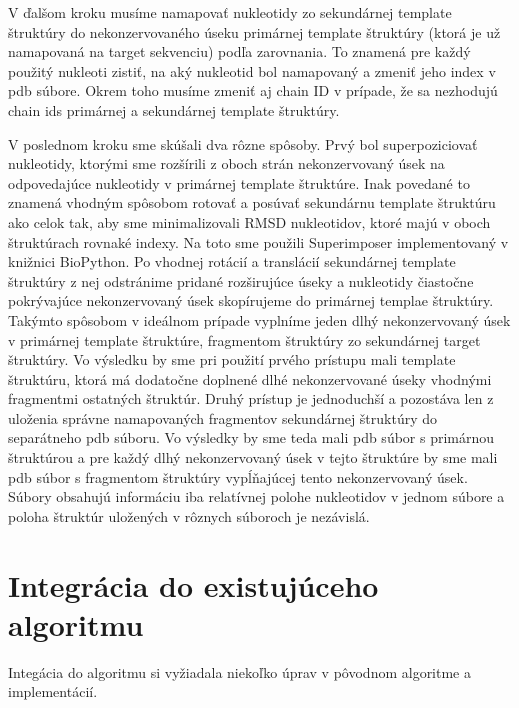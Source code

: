 \indent V ďalšom kroku musíme namapovať nukleotidy zo sekundárnej template štruktúry do nekonzervovaného úseku primárnej template štruktúry (ktorá je už namapovaná na target sekvenciu) podľa zarovnania. To znamená pre každý použitý nukleoti zistiť, na aký nukleotid bol namapovaný a zmeniť jeho index v pdb súbore. Okrem toho musíme zmeniť aj chain ID v prípade, že sa nezhodujú chain ids primárnej a sekundárnej template štruktúry.


\indent V poslednom kroku sme skúšali dva rôzne spôsoby. 
Prvý bol superpoziciovať nukleotidy, ktorými sme rozšírili z oboch strán nekonzervovaný úsek na odpovedajúce nukleotidy v primárnej template štruktúre. Inak povedané to znamená vhodným spôsobom rotovať a posúvať sekundárnu template štruktúru ako celok tak, aby sme minimalizovali RMSD nukleotidov, ktoré majú v oboch štruktúrach rovnaké indexy. Na toto sme použili Superimposer implementovaný v knižnici BioPython. Po vhodnej rotácií a translácií sekundárnej template štruktúry z nej odstránime pridané rozširujúce úseky a nukleotidy čiastočne pokrývajúce nekonzervovaný úsek skopírujeme do primárnej templae štruktúry. Takýmto spôsobom v ideálnom prípade vyplníme jeden dlhý nekonzervovaný úsek v primárnej template štruktúre, fragmentom štruktúry zo sekundárnej target štruktúry. Vo výsledku by sme pri použití prvého prístupu mali template štruktúru, ktorá má dodatočne doplnené dlhé nekonzervované úseky vhodnými fragmentmi ostatných štruktúr.
Druhý prístup je jednoduchší a pozostáva len z uloženia správne namapovaných fragmentov sekundárnej štruktúry do separátneho pdb súboru. Vo výsledky by sme  teda mali pdb súbor s primárnou štruktúrou a pre každý dlhý nekonzervovaný úsek v tejto štruktúre by sme mali pdb súbor s fragmentom štruktúry vypĺňajúcej tento nekonzervovaný úsek. Súbory obsahujú informáciu iba  relatívnej polohe nukleotidov v jednom súbore a poloha štruktúr uložených v rôznych súboroch je nezávislá.

\section{Integrácia do existujúceho algoritmu}
Integácia do algoritmu si vyžiadala niekoľko úprav v pôvodnom algoritme a implementácií.

